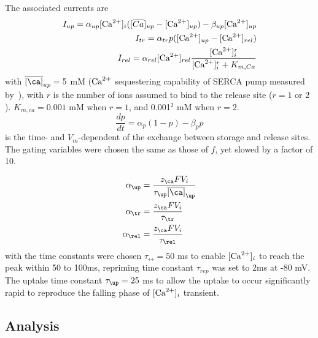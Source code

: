 \begin{enumerate}
The associated currents are
\begin{equation}
  \label{eq:738}
  \begin{split}
    I_{up} = \alpha_{up}[{\text{Ca}^{2+}}]_i ([\overline{Ca}]_{up} - [{\text{Ca}^{2+}}]_{up}) -
    \beta_{up}[{\text{Ca}^{2+}}]_{up} \\
    I_{tr} = \alpha_{tr}p([{\text{Ca}^{2+}}]_{up}-[{\text{Ca}^{2+}}]_{rel}) \\
    I_{rel} = \alpha_{rel}[{\text{Ca}^{2+}}]_{rel}\frac{[{\text{Ca}^{2+}}]_i^r}{[{\text{Ca}^{2+}}]_i^r + K_{m,Ca}}
  \end{split}
\end{equation}
with $\overline{[\ca]}_{up}=5$ mM (${\text{Ca}^{2+}}$ sequestering capability of SERCA
pump measured by~\citep{chapman1979}), with $r$ is the number of
 ions assumed to bind to the release site ($r=1$ or
$2$). $K_{m,ca}=0.001$ mM when $r=1$, and 0.001$^2$ mM when $r=2$.
\begin{equation}
  \label{eq:739}
  \frac{dp}{dt} = \alpha_p(1-p)-\beta_p p
\end{equation}
is the time- and $V_m$-dependent of the exchange between storage and
release sites. The gating variables were chosen the same as those of
$f$, yet slowed by a factor of 10.

\begin{equation}
  \label{eq:1350}
  \begin{split}
    \alpha_\up &= \frac{z_\ca FV_i}{\tau_\up \overline{[\ca]}_\up} \\
    \alpha_\tr &=  \frac{z_\ca FV_i}{\tau_\tr} \\
    \alpha_\rel &=  \frac{z_\ca FV_i}{\tau_\rel} \
  \end{split}
\end{equation}
with the time constants were chosen $\tau_\rel=50$ ms to enable
$[{\text{Ca}^{2+}}]_i$ to reach the peak within 50 to 100ms, repriming time
constant $\tau_{rep}$ was set to 2ms at -80 mV. The uptake time
constant $\tau_\up =25$ ms to allow the uptake to occur significantly
rapid to reproduce the falling phase of $[{\text{Ca}^{2+}}]_i$ transient. 

\end{enumerate}

\subsection{Analysis}
\label{sec:analysis-9}

